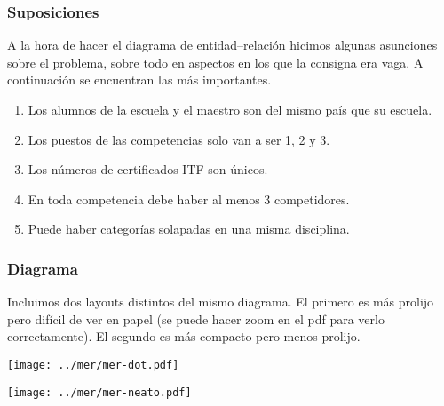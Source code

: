 
\subsubsection{Suposiciones}

A la hora de hacer el diagrama de entidad--relación hicimos algunas asunciones sobre el problema, sobre todo en aspectos en los que la consigna era vaga. A continuación se encuentran las más importantes.

\begin{enumerate}
	\item Los alumnos de la escuela y el maestro son del mismo país que su escuela.
	\item Los puestos de las competencias solo van a ser 1, 2 y 3.
	\item Los números de certificados ITF son únicos.
	\item En toda competencia debe haber al menos 3 competidores.
	\item Puede haber categorías solapadas en una misma disciplina.
\end{enumerate}

\subsubsection{Diagrama}

Incluimos dos layouts distintos del mismo diagrama. El primero es más prolijo pero difícil de ver en papel (se puede hacer zoom en el pdf para verlo correctamente). El segundo es más compacto pero menos prolijo.

\newpage

\noindent
\texttt{[image: ../mer/mer-dot.pdf]}

\noindent
\texttt{[image: ../mer/mer-neato.pdf]}

